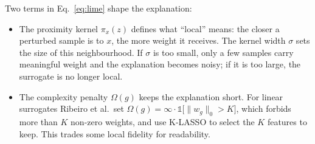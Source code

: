 \documentclass[11pt,a4paper]{article}
\newcommand{\code}[1]{\texttt{#1}}
\begin{document}
Two terms in Eq.~\eqref{eq:lime} shape the explanation:
\begin{itemize}
  \item The proximity kernel $\pi_x(z)$ defines what ``local'' means: the closer
        a perturbed sample is to $x$, the more weight it receives. The kernel
        width $\sigma$ sets the size of this neighbourhood. If $\sigma$ is too
        small, only a few samples carry meaningful weight and the explanation
        becomes noisy; if it is too large, the surrogate is no longer local.
  \item The complexity penalty $\Omega(g)$ keeps the explanation short. For
        linear surrogates Ribeiro et al.\ set
        $\Omega(g) = \infty \cdot \mathbb{1}\big[\lVert w_g \rVert_0 > K\big]$,
        which forbids more than $K$ non-zero weights, and use K-LASSO to
        select the $K$ features to keep. This trades some local fidelity for
        readability.
\end{itemize}
\end{document}
